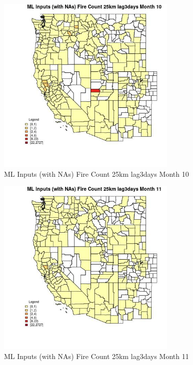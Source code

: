 \begin{figure} 
\centering  
\includegraphics[width=0.77\textwidth]{Code_Outputs/Report_ML_input_PM25_Step4_part_f_de_duplicated_aveswNAs_CountyFire_Count_25km_lag3daysmedianMonth10.jpg} 
\caption{\label{fig:Report_ML_input_PM25_Step4_part_f_de_duplicated_aveswNAsCountyFire_Count_25km_lag3daysmedianMonth10}ML Inputs (with NAs) Fire Count 25km lag3days Month 10} 
\end{figure} 
 

\begin{figure} 
\centering  
\includegraphics[width=0.77\textwidth]{Code_Outputs/Report_ML_input_PM25_Step4_part_f_de_duplicated_aveswNAs_CountyFire_Count_25km_lag3daysmedianMonth11.jpg} 
\caption{\label{fig:Report_ML_input_PM25_Step4_part_f_de_duplicated_aveswNAsCountyFire_Count_25km_lag3daysmedianMonth11}ML Inputs (with NAs) Fire Count 25km lag3days Month 11} 
\end{figure} 
 

